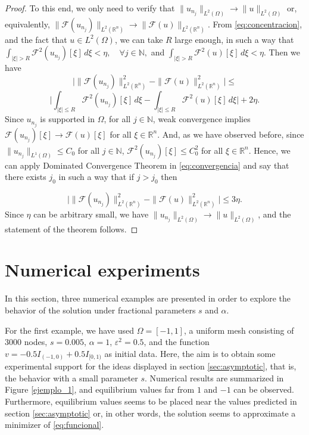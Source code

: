 \documentclass{amsart}
\newcommand{\rn}{{\mathbb{R}^n}}
\newcommand{\Fu}{\mathcal{F}}
\newcommand{\W}{\Omega}
\newcommand{\eps}{\varepsilon}
\def\N{{\mathbb {N}}}
\theoremstyle{remark}
\theoremstyle{definition}
\numberwithin{equation}{section}
\begin{document}
\begin{proof}
To this end, we only need to verify that $\|u_{n_j}\|_{L^2(\W)} \to \|u\|_{L^2(\W)}$ or, equivalently, $\|\Fu(u_{n_j})\|_{L^2(\rn)} \to \|\Fu(u)\|_{L^2(\rn)}$. From \eqref{eq:concentracion}, and the fact that $u \in L^2(\W)$, we can take $R$ large enough, in such a way that $\int_{|\xi|> R} \Fu^2(u_{n_j})[\xi] \,d\xi < \eta, \quad \forall j \in \N,$
and
$\int_{|\xi|> R} \Fu^2(u)[\xi] \,d\xi < \eta.$ 
Then we have 
\begin{equation}
\label{eq:convergencia}
\Big| \|\Fu(u_{n_j})\|^2_{L^2(\rn)} - \|\Fu(u)\|^2_{L^2(\rn)} \Big| \leq  
\end{equation}
$$\Big| \int_{|\xi| \leq R} \Fu^2(u_{n_j})[\xi] \, d\xi- \int_{|\xi| \leq R} \Fu^2(u)[\xi]\, d\xi \Big| + 2\eta.$$   
Since $u_{n_j}$ is supported in $\W$, for all $j \in \N$, weak convergence implies $\Fu(u_{n_j})[\xi] \to \Fu(u)[\xi]$ for all $\xi \in \rn$. And, as we have observed before, since $\|u_{n_j}\|_{L^1(\W)} \leq C_0$ for all $j \in \N$, $\Fu^2(u_{n_j})[\xi] \leq C^2_0$ for all $\xi \in \rn$. Hence, we can apply Dominated Convergence Theorem in \eqref{eq:convergencia} and say that there exists $j_0$ in such a way that if $j>j_0$ then               
 
\begin{equation}
\label{eq:convergencia2}
\Big| \|\Fu(u_{n_j})\|^2_{L^2(\rn)} - \|\Fu(u)\|^2_{L^2(\rn)} \Big| \leq 3\eta. 
\end{equation}
Since $\eta$ can be arbitrary small, we have $\|u_{n_j}\|_{L^2(\W)} \to \|u\|_{L^2(\W)}$, and the statement of the theorem follows. 


\end{proof} 

\section{Numerical experiments} \label{sec:numerical}

In this section, three numerical examples are presented in order to explore the behavior of the solution under fractional parameters $s$ and $\alpha$.    

For the first example, we have used $\W = [-1,1]$, a uniform mesh consisting of $3000$ nodes, $s = 0.005$, $\alpha = 1$, $\eps^2=0.5$, and the function $v = -0.5 I_{(-1,0)} +  0.5 I_{[0,1)}$ as initial data. Here, the aim is to obtain some experimental support for the ideas displayed in section \ref{sec:asymptotic}, that is, the behavior with a small parameter $s$. Numerical results are summarized in Figure \ref{ejemplo_1}, and equilibrium values far from $1$ and $-1$ can be observed. Furthermore, equilibrium values seems to be placed near the values predicted in section \ref{sec:asymptotic} or, in other words, the solution seems to approximate a minimizer of \eqref{eq:funcional}. 
\end{document}
